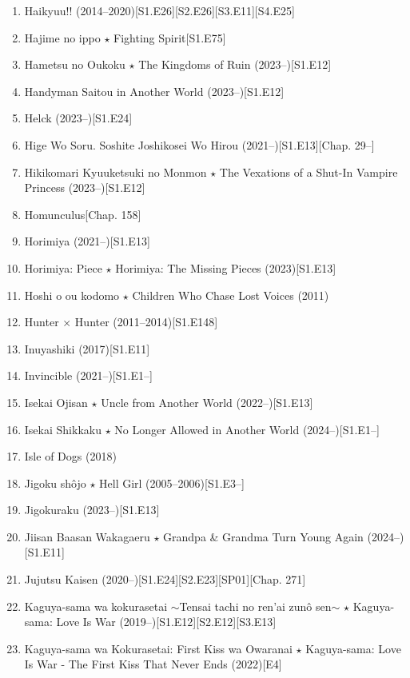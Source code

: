 \documentclass{article}
\begin{document}
\begin{enumerate}
    \item {\sc Haikyuu!!} (2014--2020)\hfill[S1.E26][S2.E26][S3.E11][S4.E25]
    \item {\sc Hajime no ippo $\star$ Fighting Spirit}\hfill[S1.E75]
    \item {\sc Hametsu no Oukoku $\star$ The Kingdoms of Ruin} (2023--)\hfill[S1.E12]
    \item Handyman Saitou in Another World (2023--)\hfill[S1.E12]
    \item {\sc Helck} (2023--)\hfill[S1.E24]
    \item {\sc Hige Wo Soru. Soshite Joshikosei Wo Hirou} (2021--)\hfill[S1.E13][Chap. 29--]
    \item {\sc Hikikomari Kyuuketsuki no Monmon $\star$ The Vexations of a Shut-In Vampire Princess} (2023--)\hfill[S1.E12]
    \item {\sc Homunculus}\hfill[Chap. 158]
    \item {\sc Horimiya} (2021--)\hfill[S1.E13]
    \item {\sc Horimiya: Piece $\star$ Horimiya: The Missing Pieces} (2023)\hfill[S1.E13]
    \item {\sc Hoshi o ou kodomo $\star$ Children Who Chase Lost Voices} (2011)
    \item {\sc Hunter $\times$ Hunter} (2011--2014)\hfill[S1.E148]
    \item {\sc Inuyashiki} (2017)\hfill[S1.E11]
    \item Invincible (2021--)\hfill[S1.E1--]
    \item Isekai Ojisan $\star$ Uncle from Another World (2022--)\hfill[S1.E13]
    \item Isekai Shikkaku $\star$ No Longer Allowed in Another World (2024--)\hfill[S1.E1--]
    \item {\sc Isle of Dogs} (2018)
    \item Jigoku shôjo $\star$ Hell Girl (2005--2006)\hfill[S1.E3--]
    \item Jigokuraku (2023--)\hfill[S1.E13]
    \item {\sc Jiisan Baasan Wakagaeru $\star$ Grandpa \& Grandma Turn Young Again} (2024--)\hfill[S1.E11]
    \item {\sc Jujutsu Kaisen} (2020--)\hfill[S1.E24][S2.E23][SP01][Chap. 271]
    \item Kaguya-sama wa kokurasetai $\sim$Tensai tachi no ren'ai zun\^o sen$\sim$ $\star$ Kaguya-sama: Love Is War (2019--)\hfill[S1.E12][S2.E12][S3.E13]
    \item {\sc Kaguya-sama wa Kokurasetai: First Kiss wa Owaranai $\star$ Kaguya-sama: Love Is War - The First Kiss That Never Ends} (2022)\hfill[E4]

\end{enumerate}
\end{document}
